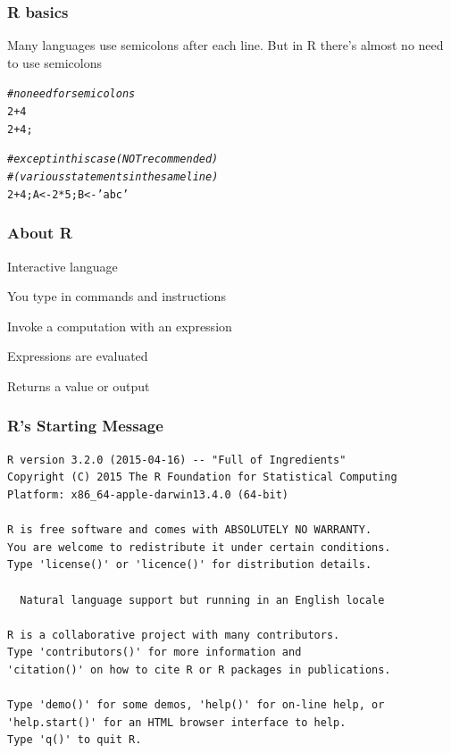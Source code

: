 \documentclass[12pt]{beamer}\usepackage[]{graphicx}\usepackage[]{color}
\makeatletter
\newcommand{\hlnum}[1]{\textcolor[rgb]{0.686,0.059,0.569}{#1}}%
\newcommand{\hlstr}[1]{\textcolor[rgb]{0.192,0.494,0.8}{#1}}%
\newcommand{\hlcom}[1]{\textcolor[rgb]{0.678,0.584,0.686}{\textit{#1}}}%
\newcommand{\hlopt}[1]{\textcolor[rgb]{0,0,0}{#1}}%
\newcommand{\hlstd}[1]{\textcolor[rgb]{0.345,0.345,0.345}{#1}}%
\newcommand{\hlkwb}[1]{\textcolor[rgb]{0.69,0.353,0.396}{#1}}%
\newenvironment{kframe}{%
 \def\at@end@of@kframe{}%
 \ifinner\ifhmode%
  \def\at@end@of@kframe{\end{minipage}}%
  \begin{minipage}{\columnwidth}%
 \fi\fi%
 \def\FrameCommand##1{\hskip\@totalleftmargin \hskip-\fboxsep
 \colorbox{shadecolor}{##1}\hskip-\fboxsep
     \hskip-\linewidth \hskip-\@totalleftmargin \hskip\columnwidth}%
 \MakeFramed {\advance\hsize-\width
   \@totalleftmargin\z@ \linewidth\hsize
   \@setminipage}}%
 {\par\unskip\endMakeFramed%
 \at@end@of@kframe}
\newenvironment{knitrout}{}{} %
\makeatother
\begin{document}

\begin{frame}[fragile]
\frametitle{R basics}

Many languages use semicolons after each line. But in R there's almost no need to use semicolons
\begin{knitrout}\footnotesize
{}\color{fgcolor}\begin{kframe}
\begin{alltt}
\hlcom{# no need for semicolons}
\hlnum{2} \hlopt{+} \hlnum{4}
\hlnum{2} \hlopt{+} \hlnum{4}\hlstd{;}

\hlcom{# except in this case (NOT recommended)}
\hlcom{# (various statements in the same line)}
\hlnum{2} \hlopt{+} \hlnum{4}\hlstd{; A} \hlkwb{<-} \hlnum{2} \hlopt{*} \hlnum{5}\hlstd{; B} \hlkwb{<-} \hlstr{'abc'}
\end{alltt}
\end{kframe}
\end{knitrout}

\end{frame}


\begin{frame}
\frametitle{About R}

\bi
  \item Interactive language
  \item You type in commands and instructions
  \item Invoke a computation with an expression
  \item Expressions are evaluated
  \item Returns a value or output
\ei

\end{frame}


\begin{frame}[fragile]
\frametitle{R's Starting Message}

{\scriptsize \begin{verbatim}
R version 3.2.0 (2015-04-16) -- "Full of Ingredients"
Copyright (C) 2015 The R Foundation for Statistical Computing
Platform: x86_64-apple-darwin13.4.0 (64-bit)

R is free software and comes with ABSOLUTELY NO WARRANTY.
You are welcome to redistribute it under certain conditions.
Type 'license()' or 'licence()' for distribution details.

  Natural language support but running in an English locale

R is a collaborative project with many contributors.
Type 'contributors()' for more information and
'citation()' on how to cite R or R packages in publications.

Type 'demo()' for some demos, 'help()' for on-line help, or
'help.start()' for an HTML browser interface to help.
Type 'q()' to quit R.
\end{verbatim}
}

\end{frame}
\end{document}
